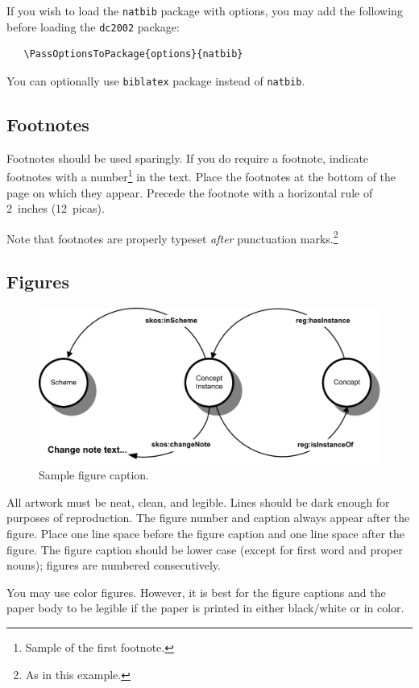 \documentclass[11pt,a4paper]{article}
\begin{document}
If you wish to load the \verb+natbib+ package with options, you may add the
following before loading the \verb+dc2002+ package:
\begin{verbatim}
   \PassOptionsToPackage{options}{natbib}
\end{verbatim}

You can optionally use \verb+biblatex+ package instead of \verb+natbib+.

\subsection{Footnotes}

Footnotes should be used sparingly.  If you do require a footnote, indicate
footnotes with a number\footnote{Sample of the first footnote.} in the
text. Place the footnotes at the bottom of the page on which they appear.
Precede the footnote with a horizontal rule of 2~inches (12~picas).

Note that footnotes are properly typeset \emph{after} punctuation
marks.\footnote{As in this example.}

\subsection{Figures}

\begin{figure}
  \centering
  \includegraphics[width=0.6\linewidth]{figure.pdf}
  \caption{Sample figure caption.}
\end{figure}

All artwork must be neat, clean, and legible. Lines should be dark enough for
purposes of reproduction. The figure number and caption always appear after the
figure. Place one line space before the figure caption and one line space after
the figure. The figure caption should be lower case (except for first word and
proper nouns); figures are numbered consecutively.

You may use color figures.  However, it is best for the figure captions and the
paper body to be legible if the paper is printed in either black/white or in
color.
\end{document}
